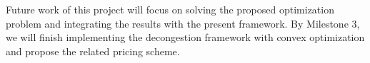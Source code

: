 \documentclass[times, 10pt,twocolumn]{article}
\begin{document}
Future work of this project will focus on solving the proposed optimization problem and integrating the results with the present framework. By Milestone 3, we will finish implementing the decongestion framework with convex optimization and propose the related pricing scheme.

\end{document}
